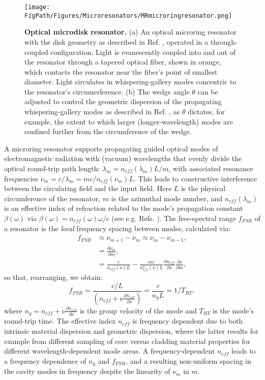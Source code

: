 \begin{figure}[htpb]
	\begin{center}
		\texttt{[image: \\FigPath/Figures/Microresonators/MRmicroringresonator.png]}
	\end{center}
	\caption[Optical microdisk resonator]{\textbf{Optical microdisk resonator.} (a) An optical microring resonator with the disk geometry as described in Ref. \cite{Lee2012}, operated in a through-coupled configuration. Light is evanescently coupled into and out of the resonator through a tapered optical fiber, shown in orange, which contacts the resonator near the fiber's point of smallest diameter. Light circulates in whispering-gallery modes concentric to the resonator's circumerference. (b) The wedge angle $\theta$ can be adjusted to control the geometric dispersion of the propagating whispering-gallery modes as described in Ref. \cite{Yang2016}, as $\theta$ dictates, for example, the extent to which larger (longer-wavelength) modes are confined further from the circumference of the wedge. }
	
	\label{fig:microringresonator}
\end{figure} 


A microring resonator supports propagating guided optical modes of electromagnetic radiation with (vacuum) wavelengths that evenly divide the optical round-trip path length: $\lambda_m=n_{eff}(\lambda_m)L/m$, with associated resonance frequencies $\nu_m=c/\lambda_m=mc/n_{eff}(\nu_m)L$. This leads to constructive interference between the circulating field and the input field. Here $L$ is the physical circumference of the resonator, $m$ is the azimuthal mode number, and $n_{eff}(\lambda_m)$ is an effective index of refraction related to the mode's propagation constant $\beta(\omega)$ via $\beta(\omega)=n_{eff}(\omega)\omega/c$ (see e.g. Refs. \cite{Agrawal2007,Calvo2007}). The free-spectral range $f_{FSR}$ of a resonator is the \textit{local} frequency spacing between modes, calculated via:
\begin{align}
	f_{FSR}&\approx \nu_{m+1}-\nu_{m}\approx \nu_{m}-\nu_{m-1},\\
	&=\frac{\partial\nu_m}{\partial m},\\
	&=\frac{c}{n_{eff}(\nu)L}-\frac{mc}{n_{eff}^2(\nu)L}\frac{\partial n_{eff}}{\partial \nu}\frac{\partial \nu}{\partial m},
	\end{align}
	so that, rearranging, we obtain:
	\begin{equation}
	f_{FSR}=\frac{c/L}{\left(n_{eff}+\nu\frac{\partial n_{eff}}{\partial \nu}\right)}=\frac{c}{n_g L}=1/T_{RT},
\end{equation}
	where $n_g=n_{eff}+\nu\frac{\partial n_{eff}}{\partial \nu}$ is the group velocity of the mode and $T_{RT}$ is the mode's round-trip time. The effective index $n_{eff}$ is frequency dependent due to both intrinsic material dispersion and geometric dispersion, where the latter results for example from different sampling of core versus cladding material properties for different wavelength-dependent mode areas. A frequency-dependent $n_{eff}$ leads to a frequency dependence of $n_g$ and $f_{FSR}$, and a resulting non-uniform spacing in the cavity modes in frequency despite the linearity of $\nu_m$ in $m$. 
	
